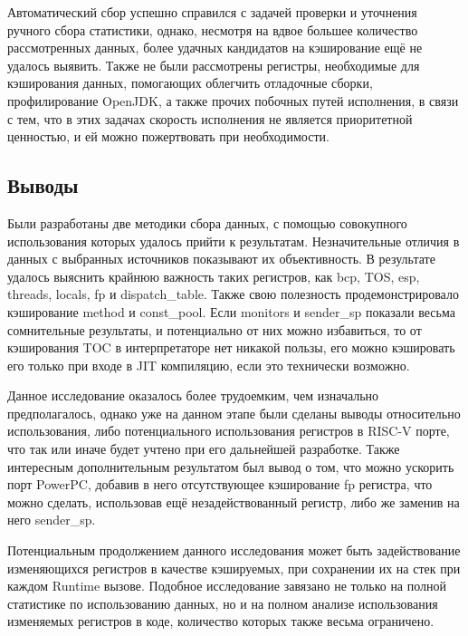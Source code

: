 Автоматический сбор успешно справился с задачей проверки и уточнения ручного сбора статистики, однако, несмотря на вдвое большее количество рассмотренных данных, более удачных кандидатов на кэширование ещё не удалось выявить. Также не были рассмотрены регистры, необходимые для кэширования данных, помогающих облегчить отладочные сборки, профилирование OpenJDK, а также прочих побочных путей исполнения, в связи с тем, что в этих задачах скорость исполнения не является приоритетной ценностью, и ей можно пожертвовать при необходимости. 


\subsection{Выводы}

Были разработаны две методики сбора данных, с помощью совокупного использования которых удалось прийти к результатам. Незначительные отличия в данных с выбранных источников показывают их объективность. В результате удалось выяснить крайнюю важность таких регистров, как bcp, TOS, esp, threads, locals, fp и dispatch\_table. Также свою полезность продемонстрировало кэширование method и const\_pool. Если monitors и sender\_sp показали весьма сомнительные результаты, и потенциально от них можно избавиться, то от кэширования TOC в интерпретаторе нет никакой пользы, его можно кэшировать его только при входе в JIT компиляцию, если это технически возможно.

Данное исследование оказалось более трудоемким, чем изначально предполагалось, однако уже на данном этапе были сделаны выводы относительно использования, либо потенциального использования регистров в RISC-V порте, что так или иначе будет учтено при его дальнейшей разработке. Также интересным дополнительным результатом был вывод о том, что можно ускорить порт PowerPC, добавив в него отсутствующее кэширование fp регистра, что можно сделать, использовав ещё незадействованный регистр, либо же заменив на него sender\_sp.

Потенциальным продолжением данного исследования может быть задействование изменяющихся регистров в качестве кэшируемых, при сохранении их на стек при каждом Runtime вызове. Подобное исследование завязано не только на полной статистике по использованию данных, но и на полном анализе использования изменяемых регистров в коде, количество которых также весьма ограничено. 
